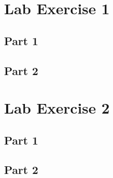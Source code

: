 \begin{appendices}
	\label{Appendix:start}
	\section{Lab Exercise 1}
	{
		\subsection{Part 1}
		{
			\label{appendix:ex1-1}
			
		}
		\subsection{Part 2}
		{
			\label{appendix:ex1-2}
			
		}
	}
	\section{Lab Exercise 2}
	{
		\subsection{Part 1}
		{
			\label{appendix:ex2-1}
			
		}
		\subsection{Part 2}
		{
			\label{appendix:ex2-2}
			
		}
	}

\end{appendices}